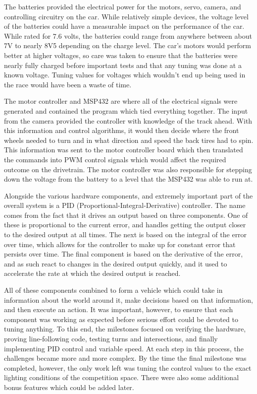 \documentclass[conference]{IEEEtran}
\begin{document}
    The batteries provided the electrical power for the motors, servo, camera,
    and controlling circuitry on the car. While relatively simple devices, the
    voltage level of the batteries could have a measurable impact on the
    performance of the car. While rated for 7.6 volts, the batteries could
    range from anywhere between about 7V to nearly 8V5 depending on the charge
    level. The car's motors would perform better at higher voltages, so care
    was taken to ensure that the batteries were nearly fully charged before
    important tests and that any tuning was done at a known voltage. Tuning
    values for voltages which wouldn't end up being used in the race would
    have been a waste of time.
    
    The motor controller and MSP432 are where all of the electrical signals
    were generated and contained the program which tied everything together.
    The input from the camera provided the controller with knowledge of the
    track ahead. With this information and control algorithms, it would then
    decide where the front wheels needed to turn and in what direction and
    speed the back tires had to spin. This information was sent to the motor
    controller board which then translated the commands into PWM control
    signals which would affect the required outcome on the drivetrain. The
    motor controller was also responsible for stepping down the voltage from
    the battery to a level that the MSP432 was able to run at.

    Alongside the various hardware components, and extremely important part of the overall system is a PID (Proportional-Integral-Derivative) controller.
    The name comes from the fact that it drives an output based on three components. One of these is proportional to the current error, and handles getting
    the output closer to the desired output at all times. The next is based on the integral of the error over time, which allows for the controller to make
    up for constant error that persists over time. The final component is based on the derivative of the error, and as such react to changes in the desired
    output quickly, and it used to accelerate the rate at which the desired output is reached.

    All of these components combined to form a vehicle which could take in
    information about the world around it, make decisions based on that
    information, and then execute an action. It was important, however, to
    ensure that each component was working as expected before serious effort
    could be devoted to tuning anything. To this end, the milestones focused
    on verifying the hardware, proving line-following code, testing turns and
    intersections, and finally implementing PID control and variable speed.
    At each step in this process, the challenges became more and more complex.
    By the time the final milestone was completed, however, the only work left
    was tuning the control values to the exact lighting conditions of the
    competition space. There were also some additional bonus features which
    could be added later.
\end{document}
